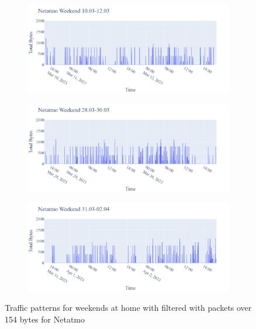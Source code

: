 \begin{figure}[H]
\begin{subfigure}[b]{0.47\textwidth}
    \end{subfigure}
    \begin{subfigure}[b]{0.47\textwidth}
        \includegraphics[width=1.1\hsize]{figures/Netatmo_Weekend_BigBytes_10.03-12.03.png}
    \end{subfigure}
    \begin{subfigure}[b]{0.47\textwidth}
        \includegraphics[width=1.1\hsize]{figures/Netatmo_Weekend_BigBytes_28.03-30.03.png}
    \end{subfigure}
    \begin{subfigure}[b]{0.47\textwidth}
        \includegraphics[width=1.1\hsize]{figures/Netatmo_Weekend_BigBytes_31.03-02.04.png}
    \end{subfigure}
    \caption{Traffic patterns for weekends at home with filtered with packets over 154 bytes for Netatmo}
    \label{fig:NetatmoBigPackets}
\end{figure}

